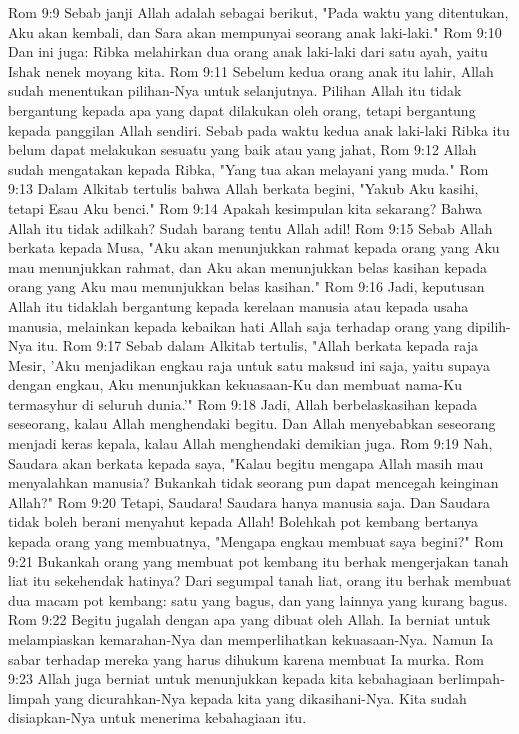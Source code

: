 Rom 9:9  Sebab janji Allah adalah sebagai berikut, "Pada waktu yang ditentukan, Aku akan kembali, dan Sara akan mempunyai seorang anak laki-laki."
Rom 9:10  Dan ini juga: Ribka melahirkan dua orang anak laki-laki dari satu ayah, yaitu Ishak nenek moyang kita.
Rom 9:11  Sebelum kedua orang anak itu lahir, Allah sudah menentukan pilihan-Nya untuk selanjutnya. Pilihan Allah itu tidak bergantung kepada apa yang dapat dilakukan oleh orang, tetapi bergantung kepada panggilan Allah sendiri. Sebab pada waktu kedua anak laki-laki Ribka itu belum dapat melakukan sesuatu yang baik atau yang jahat,
Rom 9:12  Allah sudah mengatakan kepada Ribka, "Yang tua akan melayani yang muda."
Rom 9:13  Dalam Alkitab tertulis bahwa Allah berkata begini, "Yakub Aku kasihi, tetapi Esau Aku benci."
Rom 9:14  Apakah kesimpulan kita sekarang? Bahwa Allah itu tidak adilkah? Sudah barang tentu Allah adil!
Rom 9:15  Sebab Allah berkata kepada Musa, "Aku akan menunjukkan rahmat kepada orang yang Aku mau menunjukkan rahmat, dan Aku akan menunjukkan belas kasihan kepada orang yang Aku mau menunjukkan belas kasihan."
Rom 9:16  Jadi, keputusan Allah itu tidaklah bergantung kepada kerelaan manusia atau kepada usaha manusia, melainkan kepada kebaikan hati Allah saja terhadap orang yang dipilih-Nya itu.
Rom 9:17  Sebab dalam Alkitab tertulis, "Allah berkata kepada raja Mesir, 'Aku menjadikan engkau raja untuk satu maksud ini saja, yaitu supaya dengan engkau, Aku menunjukkan kekuasaan-Ku dan membuat nama-Ku termasyhur di seluruh dunia.'"
Rom 9:18  Jadi, Allah berbelaskasihan kepada seseorang, kalau Allah menghendaki begitu. Dan Allah menyebabkan seseorang menjadi keras kepala, kalau Allah menghendaki demikian juga.
Rom 9:19  Nah, Saudara akan berkata kepada saya, "Kalau begitu mengapa Allah masih mau menyalahkan manusia? Bukankah tidak seorang pun dapat mencegah keinginan Allah?"
Rom 9:20  Tetapi, Saudara! Saudara hanya manusia saja. Dan Saudara tidak boleh berani menyahut kepada Allah! Bolehkah pot kembang bertanya kepada orang yang membuatnya, "Mengapa engkau membuat saya begini?"
Rom 9:21  Bukankah orang yang membuat pot kembang itu berhak mengerjakan tanah liat itu sekehendak hatinya? Dari segumpal tanah liat, orang itu berhak membuat dua macam pot kembang: satu yang bagus, dan yang lainnya yang kurang bagus.
Rom 9:22  Begitu jugalah dengan apa yang dibuat oleh Allah. Ia berniat untuk melampiaskan kemarahan-Nya dan memperlihatkan kekuasaan-Nya. Namun Ia sabar terhadap mereka yang harus dihukum karena membuat Ia murka.
Rom 9:23  Allah juga berniat untuk menunjukkan kepada kita kebahagiaan berlimpah-limpah yang dicurahkan-Nya kepada kita yang dikasihani-Nya. Kita sudah disiapkan-Nya untuk menerima kebahagiaan itu.
